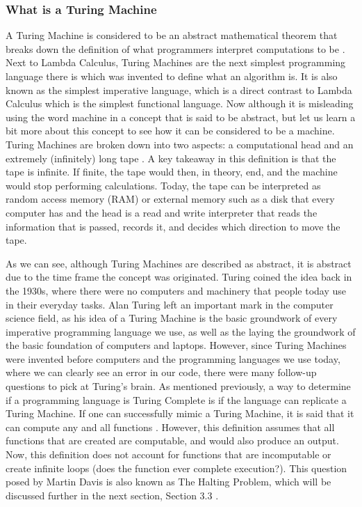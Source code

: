 \documentclass{article}
\begin{document}
\subsubsection{What is a Turing Machine}
 A Turing Machine is considered to be an abstract mathematical theorem that breaks down the definition of what programmers interpret computations to be \cite{Turing Completeness}. Next to Lambda Calculus, Turing Machines are the next simplest programming language there is which was invented to define what an algorithm is. It is also known as the simplest imperative language, which is a direct contrast to Lambda Calculus which is the simplest functional language. Now although it is misleading using the word machine in a concept that is said to be abstract, but let us learn a bit more about this concept to see how it can be considered to be a machine. Turing Machines are broken down into two aspects: a computational head and an extremely (infinitely) long tape \cite{Turing Completeness}. A key takeaway in this definition is that the tape is infinite. If finite, the tape would then, in theory, end, and the machine would stop performing calculations. Today, the tape can be interpreted as random access memory (RAM) or external memory such as a disk that every computer has and the head is a read and write interpreter that reads the information that is passed, records it, and decides which direction to move the tape. 
 
  \medskip\noindent
 As we can see, although Turing Machines are described as abstract, it is abstract due to the time frame the concept was originated. Turing coined the idea back in the 1930s, where there were no computers and machinery that people today use in their everyday tasks. Alan Turing left an important mark in the computer science field, as his idea of a Turing Machine is the basic groundwork of every imperative programming language we use, as well as the laying the groundwork of the basic foundation of computers and laptops. However, since Turing Machines were invented before computers and the programming languages we use today, where we can clearly see an error in our code, there were many follow-up questions to pick at Turing's brain. As mentioned previously, a way to determine if a programming language is Turing Complete is if the language can replicate a Turing Machine. If one can successfully mimic a Turing Machine, it is said that it can compute any and all functions \cite{Turing Completeness}. However, this definition assumes that all functions that are created are computable, and would also produce an output. Now, this definition does not account for functions that are incomputable or create infinite loops (does the function ever complete execution?). This question posed by Martin Davis is also known as The Halting Problem, which will be discussed further in the next section, Section 3.3 \cite{Turing Completeness}.
\end{document}
